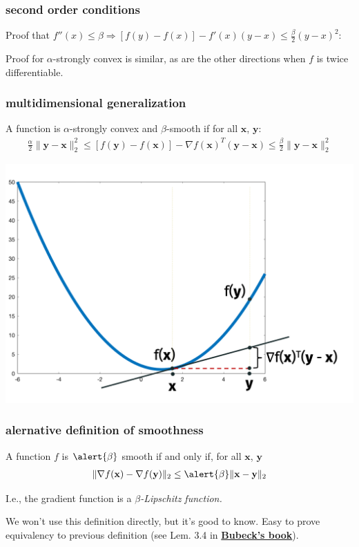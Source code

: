 \documentclass[compress]{beamer}
\newcommand{\bv}[1]{\mathbf{#1}}
\begin{document}
 \begin{frame}[t]
	\frametitle{second order conditions}
	Proof that $f''(x)\leq \beta \Rightarrow [f(y) - f(x)] - f'(x)(y-x) \leq \frac{\beta}{2}(y-x)^2$:

	\vspace{15em} Proof for $\alpha$-strongly convex is similar, as are the other directions when $f$ is twice differentiable. 
 \end{frame}

 \begin{frame}[t]
	\frametitle{multidimensional generalization}
	A function is \alert{ $\alpha$-strongly convex} and \alert{$\beta$-smooth} if for all $\bv{x}$, $\bv{y}$:
	\begin{align*}
		\frac{\alpha}{2}\|\bv{y} - \bv{x}\|_2^2 \leq \left[f(\bv{y}) - f(\bv{x})\right] - \nabla f(\bv{x})^T(\bv{y} - \bv{x}) \leq \frac{\beta}{2}\|\bv{y}-\bv{x}\|_2^2
	\end{align*}
\vspace{-2em}
\begin{center}
	\includegraphics[width=.75\textwidth]{smoothness_image.png}
\end{center}	
\end{frame}


\begin{frame}[t]
	\frametitle{alernative definition of smoothness}
	\begin{definition}
		A function $f$ is $\alert{\beta}$ smooth if and only if, for all $\bv{x}$, $\bv{y}$
		\begin{align*}
			\|\nabla f(\bv{x}) - \nabla f(\bv{y})\|_2 \leq \alert{\beta} \|\bv{x} - \bv{y}\|_2
		\end{align*}
	\end{definition}
	I.e., the gradient function is a \emph{$\beta$-Lipschitz function.} 
	
	We won't use this definition directly, but it's good to know. Easy to prove equivalency to previous definition (see Lem. 3.4 in \color{blue}\textbf{\href{https://arxiv.org/pdf/1405.4980.pdf}{Bubeck's book}}\color{black}).
 \end{frame}
\end{document}
